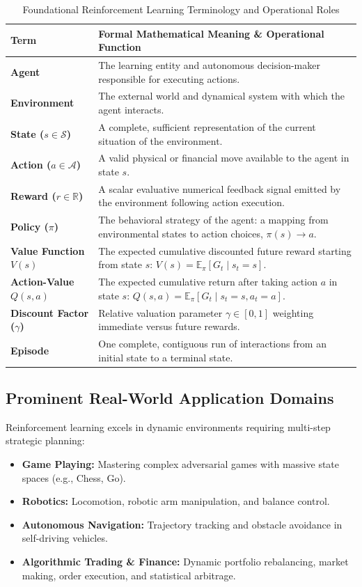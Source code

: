 \begin{table}[!htbp]
\centering
\caption{Foundational Reinforcement Learning Terminology and Operational Roles}
\label{tab:rl_terms}
\vspace{0.2em}
\renewcommand{\arraystretch}{1.3}
\begin{tabularx}{\textwidth}{>{\bfseries}lX}
\toprule
Term & Formal Mathematical Meaning \& Operational Function \\
\midrule
Agent & The learning entity and autonomous decision-maker responsible for executing actions. \\
Environment & The external world and dynamical system with which the agent interacts. \\
State ($s \in \mathcal{S}$) & A complete, sufficient representation of the current situation of the environment. \\
Action ($a \in \mathcal{A}$) & A valid physical or financial move available to the agent in state $s$. \\
Reward ($r \in \mathbb{R}$) & A scalar evaluative numerical feedback signal emitted by the environment following action execution. \\
Policy ($\pi$) & The behavioral strategy of the agent: a mapping from environmental states to action choices, $\pi(s) \to a$. \\
Value Function $V(s)$ & The expected cumulative discounted future reward starting from state $s$: $V(s) = \mathbb{E}_\pi [G_t \mid s_t = s]$. \\
Action-Value $Q(s, a)$ & The expected cumulative return after taking action $a$ in state $s$: $Q(s, a) = \mathbb{E}_\pi [G_t \mid s_t = s, a_t = a]$. \\
Discount Factor ($\gamma$) & Relative valuation parameter $\gamma \in [0, 1]$ weighting immediate versus future rewards. \\
Episode & One complete, contiguous run of interactions from an initial state to a terminal state. \\
\bottomrule
\end{tabularx}
\end{table}

\subsection{Prominent Real-World Application Domains}
Reinforcement learning excels in dynamic environments requiring multi-step strategic planning:
\begin{itemize}
    \item \textbf{Game Playing:} Mastering complex adversarial games with massive state spaces (e.g., Chess, Go).
    \item \textbf{Robotics:} Locomotion, robotic arm manipulation, and balance control.
    \item \textbf{Autonomous Navigation:} Trajectory tracking and obstacle avoidance in self-driving vehicles.
    \item \textbf{Algorithmic Trading \& Finance:} Dynamic portfolio rebalancing, market making, order execution, and statistical arbitrage.
\end{itemize}

